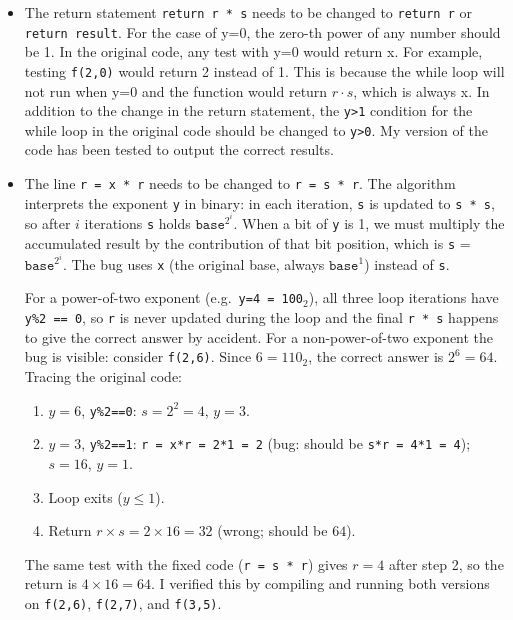 \documentclass{exam}
\begin{document}
\begin{itemize}
    \item The return statement \verb|return r * s| needs to be changed to \verb|return r| or \verb|return result|. For the case of y=0, the zero-th power of any number should be 1. In the original code, any test with y=0 would return x. For example, testing \verb|f(2,0)| would return 2 instead of 1. This is because the while loop will not run when y=0 and the function would return $r\cdot s$, which is always x. In addition to the change in the return statement, the \verb|y>1| condition for the while loop in the original code should be changed to \verb|y>0|. My version of the code has been tested to output the correct results.

    \item The line \verb|r = x * r| needs to be changed to \verb|r = s * r|. The algorithm interprets the exponent \verb|y| in binary: in each iteration, \verb|s| is updated to \verb|s * s|, so after $i$ iterations \verb|s| holds $\mathtt{base}^{2^i}$. When a bit of \verb|y| is 1, we must multiply the accumulated result by the contribution of that bit position, which is \verb|s| = $\mathtt{base}^{2^i}$. The bug uses \verb|x| (the original base, always $\mathtt{base}^1$) instead of \verb|s|.

    For a power-of-two exponent (e.g.\ \verb|y=4 = 100|${}_2$), all three loop iterations have \verb|y%2 == 0|, so \verb|r| is never updated during the loop and the final \verb|r * s| happens to give the correct answer by accident. For a non-power-of-two exponent the bug is visible: consider \verb|f(2,6)|. Since $6 = 110_2$, the correct answer is $2^6 = 64$. Tracing the original code:
    \begin{enumerate}
        \item $y=6$, \verb|y%2==0|: $s = 2^2 = 4$, $y = 3$.
        \item $y=3$, \verb|y%2==1|: \verb|r = x*r = 2*1 = 2| (bug: should be \verb|s*r = 4*1 = 4|); $s = 16$, $y = 1$.
        \item Loop exits ($y \leq 1$).
        \item Return $r \times s = 2 \times 16 = 32$ (wrong; should be $64$).
    \end{enumerate}
    The same test with the fixed code (\verb|r = s * r|) gives $r = 4$ after step 2, so the return is $4 \times 16 = 64$. I verified this by compiling and running both versions on \verb|f(2,6)|, \verb|f(2,7)|, and \verb|f(3,5)|.
\end{itemize}
\end{document}
